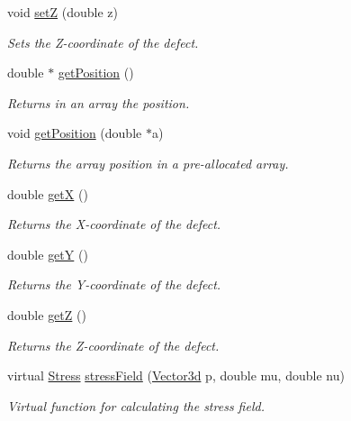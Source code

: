 \begin{DoxyCompactItemize}
void \hyperlink{classDefect_abb0b16c44a1b04d782f5c5f598b49d5b}{set\-Z} (double z)
\begin{DoxyCompactList}\small\item\em \-Sets the \-Z-\/coordinate of the defect. \end{DoxyCompactList}\item 
double $\ast$ \hyperlink{classDefect_a6842fba3ad14032766ccf0437afcbced}{get\-Position} ()
\begin{DoxyCompactList}\small\item\em \-Returns in an array the position. \end{DoxyCompactList}\item 
void \hyperlink{classDefect_aace5c752b85c368631746abc3d5bd714}{get\-Position} (double $\ast$a)
\begin{DoxyCompactList}\small\item\em \-Returns the array position in a pre-\/allocated array. \end{DoxyCompactList}\item 
double \hyperlink{classDefect_a01b96c453c13db82b5835682e1849dc0}{get\-X} ()
\begin{DoxyCompactList}\small\item\em \-Returns the \-X-\/coordinate of the defect. \end{DoxyCompactList}\item 
double \hyperlink{classDefect_a9ea8df3b4c621762a327813056e63911}{get\-Y} ()
\begin{DoxyCompactList}\small\item\em \-Returns the \-Y-\/coordinate of the defect. \end{DoxyCompactList}\item 
double \hyperlink{classDefect_a6f59edeca7ca8bfa01c54fd6b1a62374}{get\-Z} ()
\begin{DoxyCompactList}\small\item\em \-Returns the \-Z-\/coordinate of the defect. \end{DoxyCompactList}\item 
virtual \hyperlink{classStress}{\-Stress} \hyperlink{classDefect_a5730a89ce804d75090c9fa35ffdfefa2}{stress\-Field} (\hyperlink{classVector3d}{\-Vector3d} p, double mu, double nu)
\begin{DoxyCompactList}\small\item\em \-Virtual function for calculating the stress field. \end{DoxyCompactList}\end{DoxyCompactItemize}
